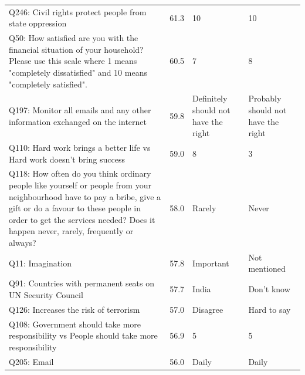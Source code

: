 \begin{tabular}{p{3.1in}lp{1.05in}p{1.05in}}
Q246: Civil rights protect people from state oppression & 61.3 & 10 & 10 \\
Q50: How satisfied are you with the financial situation of your household? Please use this scale where 1 means "completely dissatisfied" and 10 means "completely satisfied". & 60.5 & 7 & 8 \\
Q197: Monitor all emails and any other information exchanged on the internet & 59.8 & Definitely should not have the right & Probably should not have the right \\
Q110: Hard work brings a better life vs Hard work doesn't bring success & 59.0 & 8 & 3 \\
Q118: How often do you think ordinary people like yourself or people from your neighbourhood have to pay a bribe, give a gift or do a favour to these people in order to get the services needed? Does it happen never, rarely, frequently or always? & 58.0 & Rarely & Never \\
Q11: Imagination & 57.8 & Important & Not mentioned \\
Q91: Countries with permanent seats on UN Security Council & 57.7 & India & Don't know \\
Q126: Increases the risk of terrorism & 57.0 & Disagree & Hard to say \\
Q108: Government should take more responsibility vs People should take more responsibility & 56.9 & 5 & 5 \\
Q205: Email & 56.0 & Daily & Daily \\
\bottomrule
\end{tabular}

